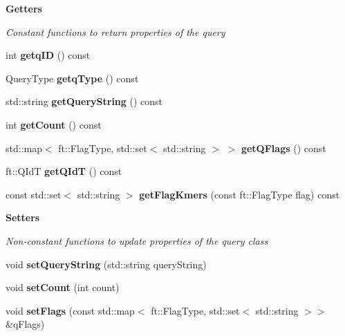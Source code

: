 \begin{Indent}\textbf{ Getters}\par
{\em Constant functions to return properties of the query }\begin{DoxyCompactItemize}
\item 
\mbox{\label{classft_1_1QueryClass_acaa6da245b9a173676de47010d799a0a}} 
int {\bfseries getq\+ID} () const
\item 
\mbox{\label{classft_1_1QueryClass_a1d4f6c36f91606a8e7e0cca964efeb51}} 
Query\+Type {\bfseries getq\+Type} () const
\item 
\mbox{\label{classft_1_1QueryClass_a950e54ff6a88ce6edbd4188e86ff023d}} 
std\+::string {\bfseries get\+Query\+String} () const
\item 
\mbox{\label{classft_1_1QueryClass_a38209ba16bb6a5e6b172da6d2c7cf387}} 
int {\bfseries get\+Count} () const
\item 
\mbox{\label{classft_1_1QueryClass_a6ca899bb19efd164dcea1f253a2d5461}} 
std\+::map$<$ ft\+::\+Flag\+Type, std\+::set$<$ std\+::string $>$ $>$ {\bfseries get\+Q\+Flags} () const
\item 
\mbox{\label{classft_1_1QueryClass_ad8f41508a315185067241c6865bc415d}} 
ft\+::\+Q\+IdT {\bfseries get\+Q\+IdT} () const
\item 
\mbox{\label{classft_1_1QueryClass_a584b1134e196f765170048ab03d958df}} 
const std\+::set$<$ std\+::string $>$ {\bfseries get\+Flag\+Kmers} (const ft\+::\+Flag\+Type flag) const
\end{DoxyCompactItemize}
\end{Indent}
\begin{Indent}\textbf{ Setters}\par
{\em Non-\/constant functions to update properties of the query class }\begin{DoxyCompactItemize}
\item 
\mbox{\label{classft_1_1QueryClass_a2d4767f9210425e22019f16688c53b33}} 
void {\bfseries set\+Query\+String} (std\+::string query\+String)
\item 
\mbox{\label{classft_1_1QueryClass_a6ace5b35bc915b612ff4111261db914d}} 
void {\bfseries set\+Count} (int count)
\item 
\mbox{\label{classft_1_1QueryClass_aec124edd8fcf0f347f7243dfb14c0973}} 
void {\bfseries set\+Flags} (const std\+::map$<$ ft\+::\+Flag\+Type, std\+::set$<$ std\+::string $>$$>$ \&q\+Flags)
\end{DoxyCompactItemize}
\end{Indent}
